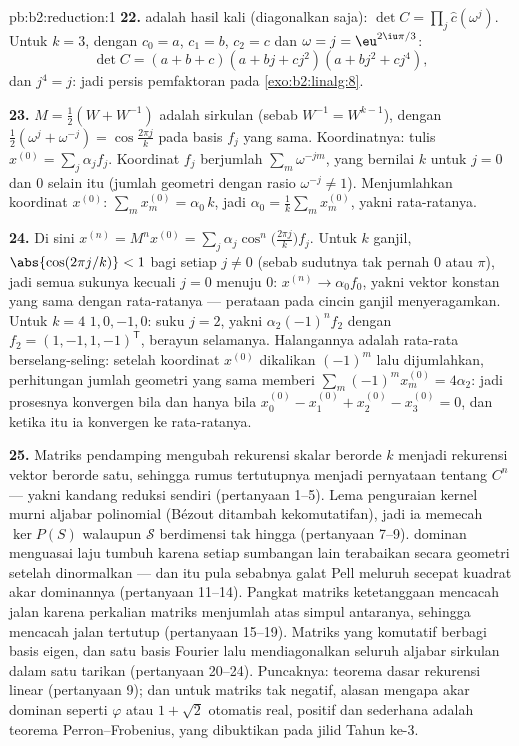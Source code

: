 \begin{solution}{pb:b2:reduction:1}
\textbf{22.}  adalah hasil kali 
(diagonalkan saja): $\det C = \prod_{j}\widehat c(\omega^j)$. Untuk $k
= 3$, dengan $c_0 = a$, $c_1 = b$, $c_2 = c$ dan $\omega = j =
\eu^{2\iu\pi/3}$:
\[
\det C = (a + b + c)(a + bj + cj^2)(a + bj^2 + cj^4),
\]
dan $j^4 = j$: jadi persis pemfaktoran pada
\cref{exo:b2:linalg:8}.

\textbf{23.} $M = \frac12(W + W^{-1})$ adalah sirkulan (sebab $W^{-1} =
W^{k-1}$), dengan  $\frac12(\omega^j + \omega^{-j}) =
\cos\frac{2\pi j}k$ pada basis $f_j$ yang sama. Koordinatnya: tulis
$x^{(0)} = \sum_j \alpha_j f_j$. Koordinat $f_j$ berjumlah
$\sum_m \omega^{-jm}$, yang bernilai $k$ untuk $j = 0$ dan $0$
selain itu (jumlah geometri dengan rasio $\omega^{-j} \neq 1$).
Menjumlahkan koordinat $x^{(0)}$: $\sum_m x^{(0)}_m =
\alpha_0\,k$, jadi $\alpha_0 = \frac1k\sum_m x^{(0)}_m$, yakni rata-ratanya.

\textbf{24.} Di sini $x^{(n)} = M^nx^{(0)} = \sum_j
\alpha_j\cos^n\bigl(\tfrac{2\pi j}k\bigr)f_j$. Untuk $k$ ganjil,
$\abs{\cos(2\pi j/k)} < 1$ bagi setiap $j \neq 0$ (sebab sudutnya
tak pernah $0$ atau $\pi$), jadi semua sukunya kecuali $j = 0$ menuju $0$:
$x^{(n)} \to \alpha_0 f_0$, yakni vektor konstan yang sama dengan
rata-ratanya --- perataan pada cincin ganjil menyeragamkan. Untuk $k = 4$
 $1, 0, -1, 0$: suku $j = 2$, yakni
$\alpha_2(-1)^nf_2$ dengan $f_2 = (1, -1, 1, -1)^{\mathsf T}$,
berayun selamanya. Halangannya adalah rata-rata berselang-seling:
setelah koordinat $x^{(0)}$ dikalikan $(-1)^m$ lalu
dijumlahkan, perhitungan jumlah geometri yang sama memberi $\sum_m
(-1)^mx^{(0)}_m = 4\alpha_2$: jadi prosesnya konvergen bila dan hanya bila
$x^{(0)}_0 - x^{(0)}_1 + x^{(0)}_2 - x^{(0)}_3 = 0$, dan ketika itu
ia konvergen ke rata-ratanya.

\textbf{25.} Matriks pendamping mengubah rekurensi skalar
berorde $k$ menjadi rekurensi vektor berorde satu, sehingga
rumus tertutupnya menjadi pernyataan tentang $C^n$ --- yakni
kandang reduksi sendiri (pertanyaan 1--5). Lema penguraian kernel
murni aljabar polinomial (Bézout ditambah kekomutatifan), jadi ia
memecah $\ker P(S)$ walaupun $\mathcal{S}$ berdimensi tak hingga
(pertanyaan 7--9).  dominan menguasai laju tumbuh karena
setiap sumbangan lain terabaikan secara geometri setelah
dinormalkan --- dan itu pula sebabnya galat Pell meluruh secepat
kuadrat akar dominannya (pertanyaan 11--14). Pangkat
matriks ketetanggaan mencacah jalan karena perkalian matriks menjumlah
atas simpul antaranya, sehingga  mencacah jalan tertutup
(pertanyaan 15--19). Matriks yang komutatif berbagi basis eigen, dan
satu basis Fourier lalu mendiagonalkan seluruh aljabar sirkulan
dalam satu tarikan (pertanyaan 20--24). Puncaknya: teorema dasar
rekurensi linear (pertanyaan 9); dan untuk matriks tak negatif,
alasan mengapa akar dominan seperti $\varphi$ atau $1 +
\sqrt2$ otomatis real, positif dan sederhana adalah
teorema Perron--Frobenius, yang dibuktikan pada jilid Tahun ke-3.

\end{solution}
